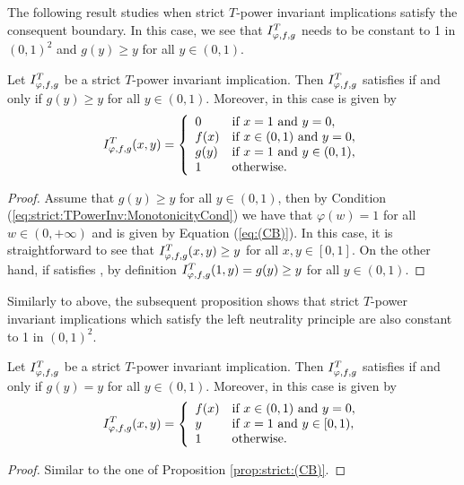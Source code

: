 The following result studies when strict $T$-power invariant implications satisfy the consequent boundary. In this case, we see that $I^T_{\varphi,f,g}$ needs to be constant to 1 in $(0,1)^2$ and $g(y) \geq y$ for all $y \in (0,1)$.
\begin{proposition}\label{prop:strict:(CB)} Let $I^T_{\varphi,f,g}$ be a strict $T$-power invariant implication. Then $I^T_{\varphi,f,g}$ satisfies \CB if and only if $g(y) \geq y$ for all $y \in (0,1)$. Moreover, in this case \IT is given by
	\begin{equation}\label{eq:(CB)}
		I^T_{\varphi,f,g}(x,y) = \left\{ \begin{array}{ll}
			0 &  \text{if }  x=1 \text{ and } y=0, \\
			f(x) & \text{if }  x \in(0,1) \text{ and }  y=0,\\
			g(y) &  \text{if }x=1 \text{ and } y \in (0,1), \\
			1 & \text{otherwise.}
		\end{array}
		\right.
	\end{equation}
\end{proposition}
\begin{proof} 
	Assume that $g(y) \geq y$ for all $y \in (0,1)$, then by Condition (\ref{eq:strict:TPowerInv:MonotonicityCond}) we have that $\varphi(w)=1$ for all $w \in (0,+\infty)$ and \IT is given by Equation (\ref{eq:(CB)}). In this case, it is straightforward to see that $I^T_{\varphi,f,g}(x,y) \geq y$ for all $x,y \in [0,1]$. On the other hand, if \IT satisfies \CB, by definition $I^T_{\varphi,f,g}(1,y)=g(y) \geq y$ for all $y \in (0,1)$.
\end{proof}
Similarly to above, the subsequent proposition shows that strict $T$-power invariant implications which satisfy the left neutrality principle are also constant to 1 in $(0,1)^2$.
\begin{proposition}\label{prop:strict:(NP)} Let $I^T_{\varphi,f,g}$ be a strict $T$-power invariant implication. Then $I^T_{\varphi,f,g}$ satisfies \NP if and only if $g(y)=y$ for all $y\in (0,1)$. Moreover, in this case \IT is given by
	\begin{equation}\label{eq:strict:(NP)}
		I^T_{\varphi,f,g}(x,y) = \left\{ \begin{array}{ll}
			f(x) & \text{if }  x \in(0,1) \text{ and }  y=0,\\
			y &  \text{if }x=1 \text{ and } y \in [0,1), \\
			1 & \text{otherwise.}
		\end{array}
		\right.
	\end{equation}
\end{proposition}
\begin{proof}
	Similar to the one of Proposition \ref{prop:strict:(CB)}.
\end{proof}

